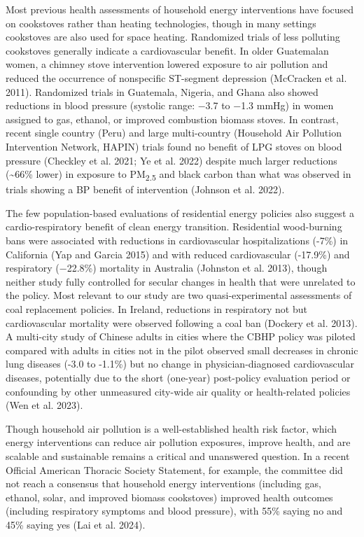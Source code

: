 \documentclass[
  letterpaper,
  DIV=11,
  numbers=noendperiod]{scrartcl}
\begin{document}
Most previous health assessments of household energy interventions have
focused on cookstoves rather than heating technologies, though in many
settings cookstoves are also used for space heating. Randomized trials
of less polluting cookstoves generally indicate a cardiovascular
benefit. In older Guatemalan women, a chimney stove intervention lowered
exposure to air pollution and reduced the occurrence of nonspecific
ST-segment depression (McCracken et al. 2011). Randomized trials in
Guatemala, Nigeria, and Ghana also showed reductions in blood pressure
(systolic range: −3.7 to −1.3 mmHg) in women assigned to gas, ethanol,
or improved combustion biomass stoves. In contrast, recent single
country (Peru) and large multi-country (Household Air Pollution
Intervention Network, HAPIN) trials found no benefit of LPG stoves on
blood pressure (Checkley et al. 2021; Ye et al. 2022) despite much
larger reductions (\textasciitilde66\% lower) in exposure to
PM\textsubscript{2.5} and black carbon than what was observed in trials
showing a BP benefit of intervention (Johnson et al. 2022).

The few population-based evaluations of residential energy policies also
suggest a cardio-respiratory benefit of clean energy transition.
Residential wood-burning bans were associated with reductions in
cardiovascular hospitalizations (-7\%) in California (Yap and Garcia
2015) and with reduced cardiovascular (-17.9\%) and respiratory
(−22.8\%) mortality in Australia (Johnston et al. 2013), though neither
study fully controlled for secular changes in health that were unrelated
to the policy. Most relevant to our study are two quasi-experimental
assessments of coal replacement policies. In Ireland, reductions in
respiratory not but cardiovascular mortality were observed following a
coal ban (Dockery et al. 2013). A multi-city study of Chinese adults in
cities where the CBHP policy was piloted compared with adults in cities
not in the pilot observed small decreases in chronic lung diseases (-3.0
to -1.1\%) but no change in physician-diagnosed cardiovascular diseases,
potentially due to the short (one-year) post-policy evaluation period or
confounding by other unmeasured city-wide air quality or health-related
policies (Wen et al. 2023).

Though household air pollution is a well-established health risk factor,
which energy interventions can reduce air pollution exposures, improve
health, and are scalable and sustainable remains a critical and
unanswered question. In a recent Official American Thoracic Society
Statement, for example, the committee did not reach a consensus that
household energy interventions (including gas, ethanol, solar, and
improved biomass cookstoves) improved health outcomes (including
respiratory symptoms and blood pressure), with 55\% saying no and 45\%
saying yes (Lai et al. 2024).
\end{document}
